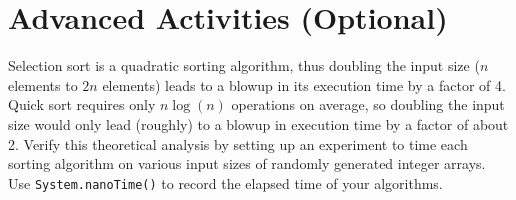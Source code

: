 \documentclass[12pt]{scrartcl}
\begin{document}
\section{Advanced Activities (Optional)}

Selection sort is a quadratic sorting algorithm, thus doubling the input size 
($n$ elements to $2n$ elements) leads to a blowup in its execution time 
by a factor of 4.  Quick sort requires only $n\log(n)$ operations on average, 
so doubling the input size would only lead (roughly) to a blowup in execution 
time by a factor of about 2.  Verify this theoretical analysis by setting up an 
experiment to time each sorting algorithm on various input sizes of randomly 
generated integer arrays.  Use \texttt{System.nanoTime()} to 
record the elapsed time of your algorithms.
	
\end{document}
